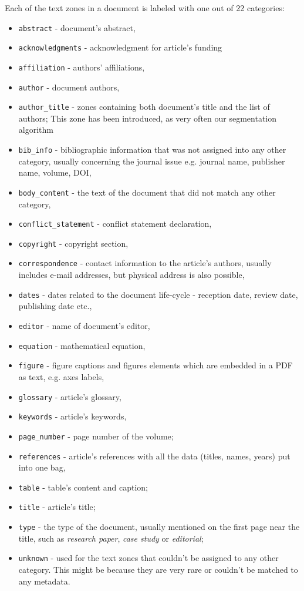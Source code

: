 Each of the text zones in a document is labeled with one out of 22 categories:
\begin{itemize}
    \item \verb+abstract+ - document's abstract,
    \item \verb+acknowledgments+ - acknowledgment for article's funding
    \item \verb+affiliation+ - authors' affiliations,
    \item \verb+author+ - document authors,
    \item \verb+author_title+ - zones containing both document's title and the list of authors; This zone has been introduced, as very often our segmentation algorithm 
    \item \verb+bib_info+ - bibliographic information that was not assigned into any other category, usually concerning the journal issue e.g. journal name, publisher name, volume, DOI,
    \item \verb+body_content+ - the text of the document that did not match any other category,
    \item \verb+conflict_statement+ - conflict statement declaration,
    \item \verb+copyright+ - copyright section,
    \item \verb+correspondence+ - contact information to the article's authors, usually includes e-mail addresses, but physical address is also possible,
    \item \verb+dates+ - dates related to the document life-cycle - reception date, review date, publishing date etc.,
    \item \verb+editor+ - name of document's editor,
    \item \verb+equation+ - mathematical equation,
    \item \verb+figure+ - figure captions and figures elements which are embedded in a PDF as text, e.g. axes labels,
    \item \verb+glossary+ - article's glossary,
    \item \verb+keywords+ - article's keywords,
    \item \verb+page_number+ - page number of the volume;
    \item \verb+references+ - article's references with all the data (titles, names, years) put into one bag,
    \item \verb+table+ - table's content and caption;
    \item \verb+title+ - article's title;
    \item \verb+type+ - the type of the document, usually mentioned on the first page near the title, such as \textit{research paper}, \textit{case study} or \textit{editorial};
    \item \verb+unknown+ - used for the text zones that couldn't be assigned to any other category. This might be because they are very rare or couldn't be matched to any metadata.
\end{itemize}
